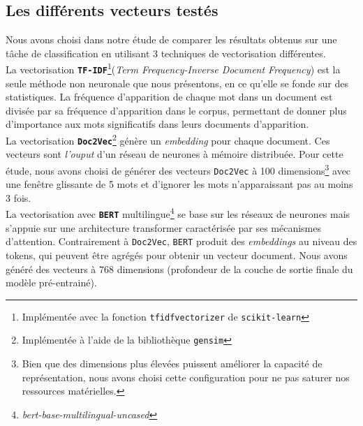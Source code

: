 \subsection{Les différents vecteurs testés}
Nous avons choisi dans notre étude de comparer les résultats obtenus sur une tâche 
de classification en utilisant 3 techniques de vectorisation différentes.\\
\indent La vectorisation \textbf{\texttt{TF-IDF}}\footnote{Implémentée avec la fonction \texttt{tfidfvectorizer} de \texttt{scikit-learn}}(\textit{Term Frequency-Inverse Document Frequency})
est la seule méthode non neuronale que nous présentons, en ce qu'elle se fonde sur des statistiques. La fréquence d'apparition de chaque mot dans un document est divisée par sa fréquence d'apparition dans le corpus,
permettant de donner plus d'importance aux mots significatifs dans leurs documents d'apparition.\\
\indent La vectorisation \textbf{\texttt{Doc2Vec}}\footnote{Implémentée à l'aide de la bibliothèque \texttt{gensim}} génère un \textit{embedding} pour chaque document. Ces vecteurs sont
\textit{l'ouput} d'un réseau de neurones à mémoire distribuée. Pour cette étude,
nous avons choisi de générer des vecteurs \texttt{Doc2Vec} à 100 dimensions\footnote{Bien que des dimensions plus élevées puissent améliorer la capacité de représentation, nous avons choisi cette configuration pour ne pas saturer nos ressources matérielles.}
avec une fenêtre glissante de 5 mots et d'ignorer les mots n'apparaissant pas au moins 3 fois.\\
\indent La vectorisation avec \textbf{\texttt{BERT}} multilingue\footnote{\textit{bert-base-multilingual-uncased}} se base sur les réseaux de neurones mais s'appuie sur une 
architecture transformer caractérisée par ses mécanismes d'attention. Contrairement à
\texttt{Doc2Vec}, \texttt{BERT} produit des \textit{embeddings} au niveau des tokens, qui peuvent être agrégés pour obtenir un vecteur document. Nous avons généré des vecteurs à 768 dimensions (profondeur de la couche de sortie finale du modèle pré-entrainé).





